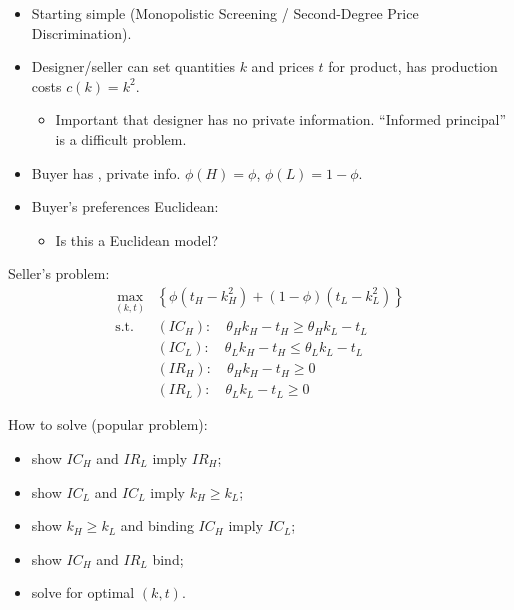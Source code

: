 \documentclass[english,handout]{beamer}		%
\def\lyxframeend{} %
\begin{document}
\begin{itemize}
	\item Starting simple (Monopolistic Screening / Second-Degree Price Discrimination).
	\item Designer/seller can set quantities $k$ and prices $t$ for product, has production costs $c(k) = k^2$.
	\pause[2]
	\begin{itemize}
		\item Important that designer has no private information. ``Informed principal'' is a difficult problem.
	\end{itemize}
	\pause[0]
	\item Buyer has , private info. $\phi(H) = \phi$, $\phi(L)=1-\phi$.
	\item Buyer's preferences Euclidean: 
	\begin{itemize}
		\item Is this a Euclidean model? %
	\end{itemize}
\end{itemize}
\lyxframeend


Seller's problem:
\vspace{-1em}\begin{align*}
	\max_{(k,t)} & \left\{ \phi (t_H - k_H^2) + (1-\phi) (t_L - k_L^2) \right\}
	\\ \text{s.t. } & (IC_H):\quad \theta_H k_H - t_H \geq \theta_H k_L - t_L
	\\ & (IC_L):\quad \theta_L k_H - t_H \leq \theta_L k_L - t_L
	\\ & (IR_H):\quad \theta_H k_H - t_H \geq 0
	\\ & (IR_L):\quad \theta_L k_L - t_L \geq 0
\end{align*}\vspace{-0.5em}
\pause

How to solve (popular problem):
\begin{itemize}[<+->]
	\item show $IC_H$ and $IR_L$ imply $IR_H$;
	\item show $IC_L$ and $IC_L$ imply $k_H \geq k_L$;
	\item show $k_H \geq k_L$ and binding $IC_H$ imply $IC_L$;
	\item show $IC_H$ and $IR_L$ bind;
	\item solve for optimal $(k,t)$.
\end{itemize}
\vspace{-2em}
\lyxframeend
\end{document}
